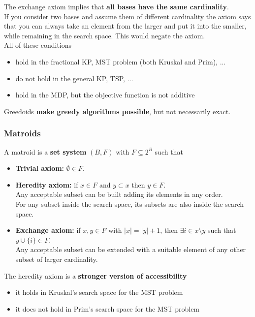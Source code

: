 \documentclass[11pt]{article}
\begin{document}
	The exchange axiom implies that \textbf{all bases have the same cardinality}. \\
	If you consider two bases and assume them of different cardinality the axiom says that you can always take an element from the larger and put it into the smaller, while remaining in the search space. This would negate the axiom.\\
	
	All of these conditions
	\begin{itemize}
		\item hold in the fractional KP, MST problem (both Kruskal and Prim), ...
		\item do not hold in the general KP, TSP, ...
		\item hold in the MDP, but the objective function is not additive
	\end{itemize}
	Greedoids \textbf{make greedy algorithms possible}, but not necessarily exact.\\
	
	\newpage
	
	\subsubsection{Matroids}
	A matroid is a \textbf{set system} $(B, F)$ with $F \subseteq 2^B$ such that
	\begin{itemize}
		\item \textbf{Trivial axiom:} $\emptyset \in F$.\\
		
		\item \textbf{Heredity axiom:} if $x \in F$ and $y \subset x$ then $y \in F$.\\
		Any acceptable subset can be built adding its elements in any order.\\
		For any subset inside the search space, its subsets are also inside the search space.\\
		
		\item \textbf{Exchange axiom:} if $x, y \in F$ with $|x| = |y| + 1$, then $\exists i \in x \setminus y$ such that $y \cup \{i\} \in F$.\\
		Any acceptable subset can be extended with a suitable element of any other subset of larger cardinality.\\
	\end{itemize}
	
	The heredity axiom is a \textbf{stronger version of accessibility}
	\begin{itemize}
		\item it holds in Kruskal's search space for the MST problem
		\item it does not hold in Prim’s search space for the MST problem
	\end{itemize}
	
\end{document}
